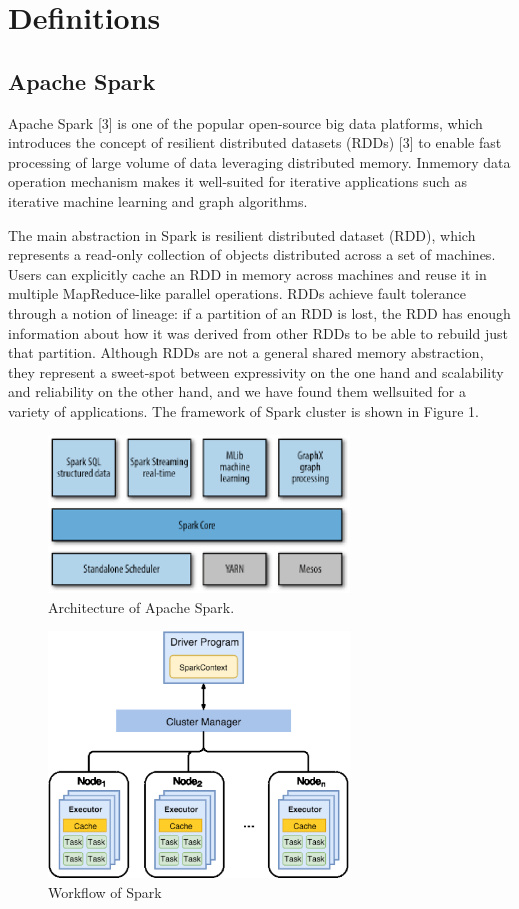 \section{Definitions}
\subsection{Apache Spark}
\par  Apache Spark [3] is one of the popular open-source big
data platforms, which introduces the concept of resilient
distributed datasets (RDDs) [3] to enable fast processing of
large volume of data leveraging distributed memory. Inmemory
data operation mechanism makes it well-suited for
iterative applications such as iterative machine learning and
graph algorithms.
\par The main abstraction in Spark is resilient distributed
dataset (RDD), which represents a read-only collection of
objects distributed across a set of machines. Users can
explicitly cache an RDD in memory across machines and
reuse it in multiple MapReduce-like parallel operations. RDDs
achieve fault tolerance through a notion of lineage: if a
partition of an RDD is lost, the RDD has enough information
about how it was derived from other RDDs to be able to
rebuild just that partition. Although RDDs are not a general
shared memory abstraction, they represent a sweet-spot
between expressivity on the one hand and scalability and
reliability on the other hand, and we have found them wellsuited
for a variety of applications. The framework of Spark
cluster is shown in Figure 1.
\par
\begin{figure}[h]
	\includegraphics[width=8cm]{1.eps}
	\caption{Architecture of Apache Spark.}\label{fig:ArchitectureSpark}
\end{figure}

\begin{figure}
	\includegraphics[width=8cm]{2.eps}
	\caption{Workflow of Spark}\label{fig:WorkflowSpark}
\end{figure}

